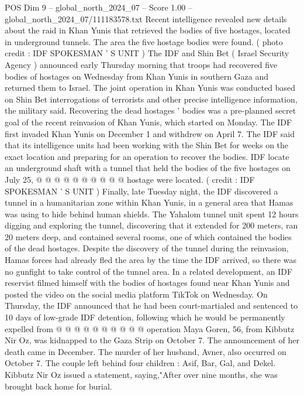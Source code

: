 \begin{textsample}{POS Dim 9 – global\_north\_2024\_07 – Score 1.00 – global\_north\_2024\_07/111183578.txt}  \label{ex:f9_pos_318}
Recent intelligence revealed new details about the raid in Khan Yunis that retrieved the bodies of five hostages, located in underground tunnels.
The area the five hostage bodies were found. ( photo credit : IDF SPOKESMAN ' S UNIT ) The IDF and Shin Bet ( Israel Security Agency ) announced early Thursday morning that troops had recovered five bodies of hostages on Wednesday from Khan Yunis in southern Gaza and returned them to Israel.
The joint operation in Khan Yunis was conducted based on Shin Bet interrogations of terrorists and other precise intelligence information, the military said.
Recovering the dead hostages ' bodies was a pre-planned secret goal of the recent reinvasion of Khan Yunis, which started on Monday.
The IDF first invaded Khan Yunis on December 1 and withdrew on April 7.
The IDF said that its intelligence units had been working with the Shin Bet for weeks on the exact location and preparing for an operation to recover the bodies.
IDF locate an underground shaft with a tunnel that held the bodies of the five hostages on July 25, @ @ @ @ @ @ @ @ @ @ hostage were located. ( credit : IDF SPOKESMAN ' S UNIT ) Finally, late Tuesday night, the IDF discovered a tunnel in a humanitarian zone within Khan Yunis, in a general area that Hamas was using to hide behind human shields.
The Yahalom tunnel unit spent 12 hours digging and exploring the tunnel, discovering that it extended for 200 meters, ran 20 meters deep, and contained several rooms, one of which contained the bodies of the dead hostages.
Despite the discovery of the tunnel during the reinvasion, Hamas forces had already fled the area by the time the IDF arrived, so there was no gunfight to take control of the tunnel area.
In a related development, an IDF reservist filmed himself with the bodies of hostages found near Khan Yunis and posted the video on the social media platform TikTok on Wednesday.
On Thursday, the IDF announced that he had been court-martialed and sentenced to 10 days of low-grade IDF detention, following which he would be permanently expelled from @ @ @ @ @ @ @ @ @ @ operation Maya Goren, 56, from Kibbutz Nir Oz, was kidnapped to the Gaza Strip on October 7.
The announcement of her death came in December.
The murder of her husband, Avner, also occurred on October 7.
The couple left behind four children : Asif, Bar, Gal, and Dekel.
Kibbutz Nir Oz issued a statement, saying,"After over nine months, she was brought back home for burial.

\end{textsample}
